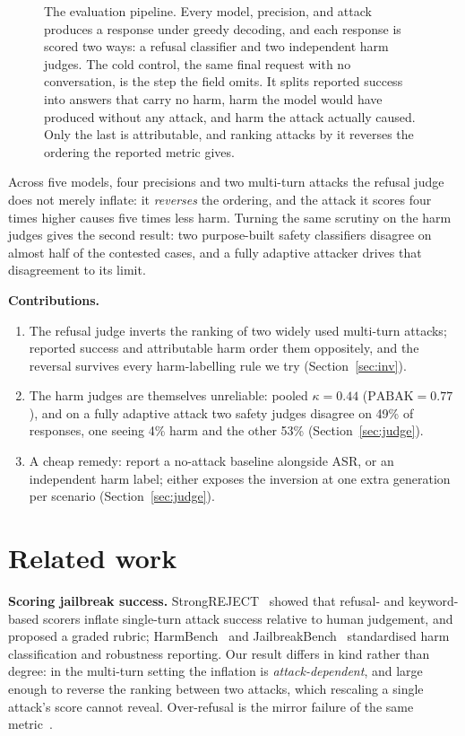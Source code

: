 \documentclass{article}
\begin{document}
\begin{figure}[t]
{}
\caption{The evaluation pipeline. Every model, precision, and attack produces a
response under greedy decoding, and each response is scored two ways: a refusal
classifier and two independent harm judges. The \textcolor{pred}{cold control},
the same final request with no conversation, is the step the field omits. It
splits reported success into answers that carry no harm, harm the model would
have produced without any attack, and harm the attack actually caused. Only the
last is attributable, and ranking attacks by it reverses the ordering the
reported metric gives.}
\label{fig:method}
\end{figure}

Across five models, four precisions and two multi-turn attacks the refusal judge
does not merely inflate: it \emph{reverses} the ordering, and the attack it
scores four times higher causes five times less harm. Turning the same scrutiny on
the harm judges gives the second result: two purpose-built safety classifiers
disagree on almost half of the contested cases, and a fully adaptive attacker
drives that disagreement to its limit.

\smallskip\noindent\textbf{Contributions.}
\begin{enumerate}\itemsep2pt
\item The refusal judge inverts the ranking of two widely used multi-turn attacks;
reported success and attributable harm order them oppositely, and the reversal
survives every harm-labelling rule we try (Section~\ref{sec:inv}).
\item The harm judges are themselves unreliable: pooled $\kappa=0.44$
($\mathrm{PABAK}=0.77$), and on a fully adaptive attack two safety judges disagree
on 49\% of responses, one seeing 4\% harm and the other 53\%
(Section~\ref{sec:judge}).
\item A cheap remedy: report a no-attack baseline alongside ASR, or an independent
harm label; either exposes the inversion at one extra generation per scenario
(Section~\ref{sec:judge}).
\end{enumerate}

\section{Related work}
\label{sec:related}

\textbf{Scoring jailbreak success.} StrongREJECT~\citep{souly2024strongreject} showed
that refusal- and keyword-based scorers inflate single-turn attack success relative
to human judgement, and proposed a graded rubric; HarmBench~\citep{mazeika2024harmbench}
and JailbreakBench~\citep{chao2024jailbreakbench} standardised harm classification
and robustness reporting. Our result differs in kind rather than degree: in the
multi-turn setting the inflation is \emph{attack-dependent}, and large enough to
reverse the ranking between two attacks, which rescaling a single attack's score
cannot reveal. Over-refusal is the mirror failure of the same
metric~\citep{rottger2024xstest}.
\end{document}
